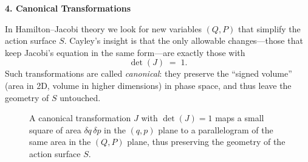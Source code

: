 \textbf{4. Canonical Transformations}

In Hamilton–Jacobi theory we look for new variables \((Q,P)\) that simplify the action surface \(S\).  Cayley’s insight is that the only allowable changes—those that keep Jacobi’s equation in the same form—are exactly those with
\[
\det(J) \;=\; 1.
\]
Such transformations are called \emph{canonical}: they preserve the “signed volume” (area in 2D, volume in higher dimensions) in phase space, and thus leave the geometry of \(S\) untouched.


\begin{figure}[H]
    \centering
    \caption{A canonical transformation $J$ with \(\det(J)=1\) maps a small square of area \(\delta q\,\delta p\) in the \((q,p)\) plane to a parallelogram of the same area in the \((Q,P)\) plane, thus preserving the geometry of the action surface \(S\).}
\end{figure}








